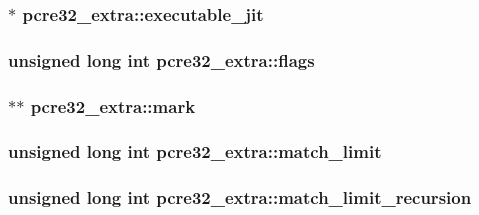 \subsubsection[{\texorpdfstring{executable\+\_\+jit}{executable_jit}}]{$\ast$ pcre32\+\_\+extra\+::executable\+\_\+jit}\hypertarget{structpcre32__extra_ab6c1e4dfd3f9774d9d100934c72c3cf8}{}\label{structpcre32__extra_ab6c1e4dfd3f9774d9d100934c72c3cf8}
\subsubsection[{\texorpdfstring{flags}{flags}}]{\setlength{\rightskip}{0pt plus 5cm}unsigned long {\bf int} pcre32\+\_\+extra\+::flags}\hypertarget{structpcre32__extra_a4f2f0985060836804aa6f8ac578eec55}{}\label{structpcre32__extra_a4f2f0985060836804aa6f8ac578eec55}
\subsubsection[{\texorpdfstring{mark}{mark}}]{$\ast$$\ast$ pcre32\+\_\+extra\+::mark}\hypertarget{structpcre32__extra_aaca66fdb0ed19effcdc2160fac33e5e5}{}\label{structpcre32__extra_aaca66fdb0ed19effcdc2160fac33e5e5}
\subsubsection[{\texorpdfstring{match\+\_\+limit}{match_limit}}]{\setlength{\rightskip}{0pt plus 5cm}unsigned long {\bf int} pcre32\+\_\+extra\+::match\+\_\+limit}\hypertarget{structpcre32__extra_af0ff51e4e354069a85acdadd0856aa91}{}\label{structpcre32__extra_af0ff51e4e354069a85acdadd0856aa91}
\subsubsection[{\texorpdfstring{match\+\_\+limit\+\_\+recursion}{match_limit_recursion}}]{\setlength{\rightskip}{0pt plus 5cm}unsigned long {\bf int} pcre32\+\_\+extra\+::match\+\_\+limit\+\_\+recursion}\hypertarget{structpcre32__extra_afe43ae2066f358fda83cb52205d56c0b}{}\label{structpcre32__extra_afe43ae2066f358fda83cb52205d56c0b}
